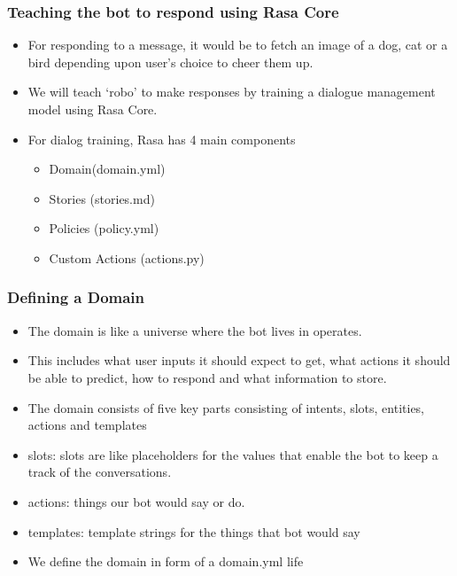  \begin{frame}[fragile]\frametitle{Teaching the bot to respond using Rasa Core}

\begin{itemize}
\item For responding to a message, it would be to fetch an image of a dog, cat or a bird depending upon user’s choice to cheer them up. 
\item We will teach ‘robo’ to make responses by training a dialogue management model using Rasa Core.
\item For dialog training, Rasa has 4 main components
\begin{itemize}
\item Domain(domain.yml)
\item Stories (stories.md)
\item Policies (policy.yml)
\item Custom Actions (actions.py)
\end{itemize}

\end{itemize}
\end{frame}


 \begin{frame}[fragile]\frametitle{Defining a Domain}

\begin{itemize}
\item The domain is like a universe where the bot lives in operates. 
\item This includes what user inputs it should expect to get, what actions it should be able to predict, how to respond and what information to store. 
\item The domain consists of five key parts consisting of intents, slots, entities, actions and templates
\item slots: slots are like placeholders for the values that enable the bot to keep a track of the conversations.
\item actions: things our bot would say or do.
\item templates: template strings for the things that bot would say
\item We define the domain in form of a domain.yml life
\end{itemize}
\end{frame}

